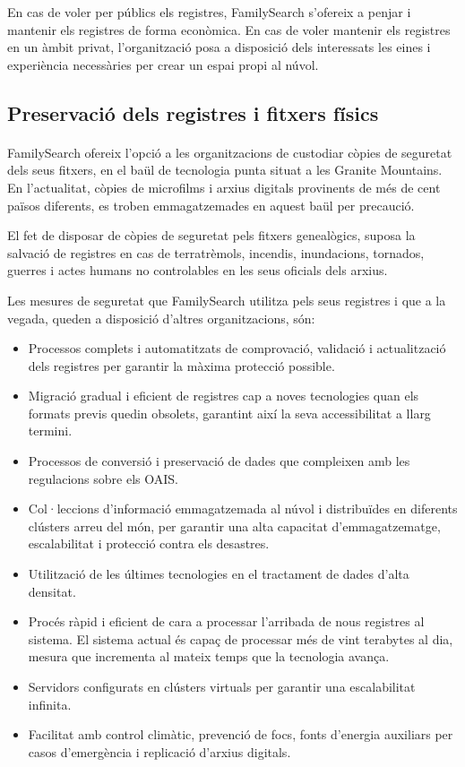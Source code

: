     En cas de voler per públics els registres, FamilySearch s’ofereix a penjar i mantenir els registres de forma econòmica. En cas de voler mantenir els registres en un àmbit privat, l’organització posa a disposició dels interessats les eines i experiència necessàries per crear un espai propi al núvol.


    \subsection{Preservació dels registres i fitxers físics}

    \paragraph{}
    FamilySearch ofereix l’opció a les organitzacions de custodiar còpies de seguretat dels seus fitxers, en el baül de tecnologia punta situat a les Granite Mountains. En l'actualitat, còpies de microfilms i arxius digitals provinents de més de cent països diferents, es troben emmagatzemades en aquest baül per precaució.

    El fet de disposar de còpies de seguretat pels fitxers genealògics, suposa la salvació de registres en cas de terratrèmols, incendis, inundacions, tornados, guerres i actes humans no controlables en les seus oficials dels arxius.

    Les mesures de seguretat que FamilySearch utilitza pels seus registres i que a la vegada, queden a disposició d’altres organitzacions, són:

    \begin{itemize}
        \item Processos complets i automatitzats de comprovació, validació i actualització dels registres per garantir la màxima protecció possible.
        \item Migració gradual i eficient de registres cap a noves tecnologies quan els formats previs quedin obsolets, garantint així la seva accessibilitat a llarg termini.
        \item Processos de conversió i preservació de dades que compleixen amb les regulacions sobre els \gls{OAIS}.
        \item Col·leccions d’informació emmagatzemada al núvol i distribuïdes en diferents clústers arreu del món, per garantir una alta capacitat d’emmagatzematge, escalabilitat i protecció contra els desastres.
        \item Utilització de les últimes tecnologies en el tractament de dades d'alta densitat.
        \item Procés ràpid i eficient de cara a processar l'arribada de nous registres al sistema. El sistema actual és capaç de processar més de vint terabytes al dia, mesura que incrementa al mateix temps que la tecnologia avança.
        \item Servidors configurats en clústers virtuals per garantir una escalabilitat infinita.
        \item Facilitat amb control climàtic, prevenció de focs, fonts d’energia auxiliars per casos d’emergència i replicació d’arxius digitals.
    \end{itemize}


